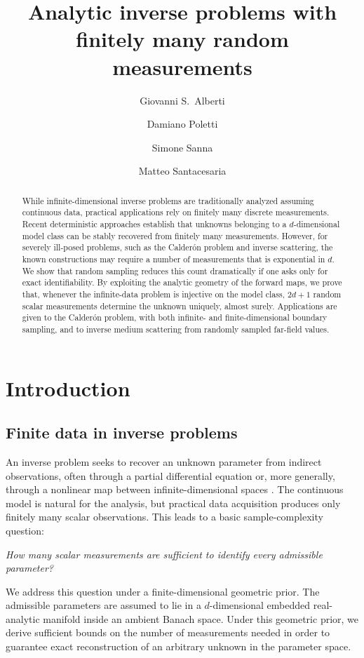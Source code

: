 \documentclass[11pt,oneside]{amsart}
\title[Finite random measurements]{Analytic inverse problems with\\ finitely many random measurements}
\author{Giovanni S.~Alberti}
\author{Damiano Poletti}
\author{Simone Sanna}
\author{Matteo Santacesaria}
\theoremstyle{plain}
\theoremstyle{definition}
\theoremstyle{remark}
\begin{document}
\begin{abstract}
While infinite-dimensional inverse problems are traditionally analyzed assuming continuous data, practical applications rely on finitely many discrete measurements. Recent deterministic approaches establish that unknowns belonging to a $d$-dimensional model class can be stably recovered from finitely many measurements. However, for severely ill-posed problems, such as the Calderón problem and inverse scattering, the known constructions may require a number of measurements that is exponential in $d$. We show that random sampling reduces this count dramatically if one asks only for exact identifiability. By exploiting the analytic geometry of the forward maps, we prove that, whenever the infinite-data problem is injective on the model class, $2d+1$ random scalar measurements determine the unknown uniquely, almost surely. Applications are given to the Calderón problem, with both infinite- and finite-dimensional boundary sampling, and to inverse medium scattering from randomly sampled far-field values.
\end{abstract}

\maketitle

\section{Introduction}\label{sec:introduction}

\subsection{Finite data in inverse problems}
An inverse problem seeks to recover an unknown parameter from indirect observations, often through a partial differential equation or, more generally, through a nonlinear map between infinite-dimensional spaces \cite{Isakov2017-qr,kirsch2011introduction}. The continuous model is natural for the analysis, but practical data acquisition produces only finitely many scalar observations. This leads to a basic sample-complexity question:
\begin{center}
\emph{How many scalar measurements are sufficient to identify every admissible parameter?}
\end{center}

We address this question under a finite-dimensional geometric prior. The admissible parameters are assumed to lie in a $d$-dimensional embedded real-analytic manifold inside an ambient Banach space. Under this geometric prior, we derive sufficient bounds on the number of measurements needed in order to guarantee exact reconstruction of an arbitrary unknown in the parameter space. 
\end{document}
